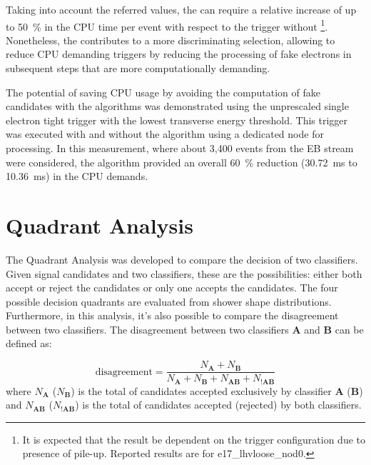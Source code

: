 Taking into account the referred values, the \rnn{} can require a
relative increase of up to \SI{50}{\%} in the \fastcalo{} CPU time per event
with respect to the trigger without \rnn{}\footnote{It is expected that the result be
	dependent on the trigger configuration due to presence of pile-up. Reported
	results are for e17\_lhvloose\_nod0.}. Nonetheless, the \rnn{} contributes to
a more discriminating selection, allowing to reduce CPU demanding triggers
by reducing the processing of fake electrons in subsequent steps that are more computationally demanding.






The potential of saving CPU usage by
avoiding the computation of fake candidates with the \rnn algorithms was demonstrated using the unprescaled single electron tight trigger with the lowest transverse energy threshold. This trigger was executed with
and without the \rnn{} algorithm using a dedicated node for processing.
In this measurement, where about 3,400 events from the EB stream were considered, the \rnn{} algorithm provided an overall
\SI{60}{\%} reduction (\SI{30.72}{\milli\second} to \SI{10.36}{\milli\second})
in the CPU demands.


\section{Quadrant Analysis}\label{ssec:quadrant}

The Quadrant Analysis was developed to compare the decision of two classifiers. Given signal candidates and two classifiers, these are the possibilities: either both accept or reject the candidates or only one accepts the candidates. The four possible decision quadrants are evaluated from shower shape distributions. Furthermore, in this analysis, it's also possible to compare the disagreement between two classifiers. The disagreement between two classifiers $\textbf{A}$ and $\textbf{B}$ can be defined as:

\begin{equation}
    \text{disagreement} = \frac{N_{\textbf{A}}+N_{\textbf{B}}}{N_{\textbf{A}}+N_{\textbf{B}}+N_{\textbf{AB}}+N_{!\textbf{AB}}}
    \label{eq:disagreement}
\end{equation}
where $N_{\textbf{A}}$ ($N_{\textbf{B}}$) is the total of candidates accepted exclusively by classifier $\textbf{A}$ ($\textbf{B}$) and $N_{\textbf{AB}}$ ($N_{\textbf{!AB}}$) is the total of candidates accepted (rejected) by both classifiers.

